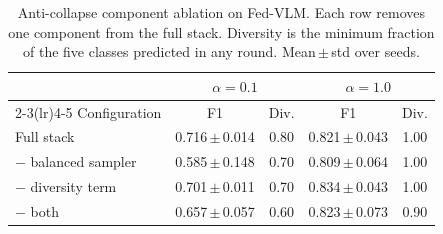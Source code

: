 \begin{table}[t]
\caption{Anti-collapse component ablation on Fed-VLM. Each row removes one
component from the full stack. Diversity is the minimum fraction of the five
classes predicted in any round. Mean\,$\pm$\,std over seeds.}
\label{tab:anticollapse}
\centering\footnotesize
\setlength\tabcolsep{4pt}
\begin{tabular}{lcccc}
\toprule
 & \multicolumn{2}{c}{$\alpha=0.1$} & \multicolumn{2}{c}{$\alpha=1.0$}\\
\cmidrule(lr){2-3}\cmidrule(lr){4-5}
Configuration & F1 & Div. & F1 & Div.\\
\midrule
Full stack & 0.716\,$\pm$\,0.014 & 0.80 & 0.821\,$\pm$\,0.043 & 1.00 \\
$-$ balanced sampler & 0.585\,$\pm$\,0.148 & 0.70 & 0.809\,$\pm$\,0.064 & 1.00 \\
$-$ diversity term & 0.701\,$\pm$\,0.011 & 0.70 & 0.834\,$\pm$\,0.043 & 1.00 \\
$-$ both & 0.657\,$\pm$\,0.057 & 0.60 & 0.823\,$\pm$\,0.073 & 0.90 \\
\bottomrule
\end{tabular}
\end{table}
